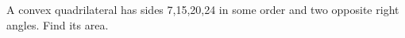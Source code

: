 A convex quadrilateral has sides 7,15,20,24 in some order and two opposite right angles. Find its area.
